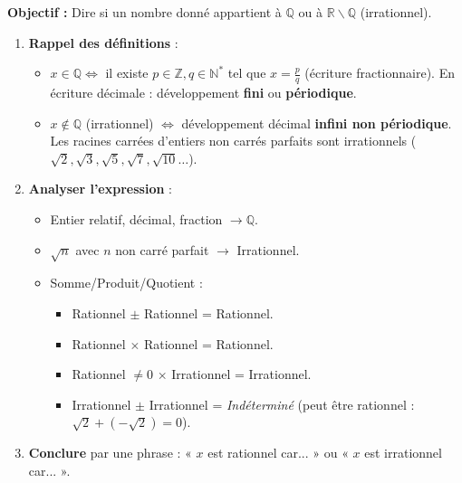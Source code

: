 \documentclass[11pt]{article}
\def\setminus{\mathbin{\backslash}}\let\smallsetminus\setminus
\begin{document}
\begin{methode}
\textbf{Objectif :} Dire si un nombre donné appartient à $\mathbb{Q}$ ou à $\mathbb{R}\setminus\mathbb{Q}$ (irrationnel).
\begin{enumerate}
    \item \textbf{Rappel des définitions} :
    \begin{itemize}
        \item $x \in \mathbb{Q} \iff$ il existe $p \in \mathbb{Z}, q \in \mathbb{N}^*$ tel que $x = \frac{p}{q}$ (écriture fractionnaire). En écriture décimale : développement \textbf{fini} ou \textbf{périodique}.
        \item $x \notin \mathbb{Q}$ (irrationnel) $\iff$ développement décimal \textbf{infini non périodique}. Les racines carrées d'entiers non carrés parfaits sont irrationnels ($\sqrt{2}, \sqrt{3}, \sqrt{5}, \sqrt{7}, \sqrt{10}\dots$).
    \end{itemize}
    \item \textbf{Analyser l'expression} :
    \begin{itemize}
        \item Entier relatif, décimal, fraction $\to \mathbb{Q}$.
        \item $\sqrt{n}$ avec $n$ non carré parfait $\to$ Irrationnel.
        \item Somme/Produit/Quotient : 
        \begin{itemize}
            \item Rationnel $\pm$ Rationnel = Rationnel.
            \item Rationnel $\times$ Rationnel = Rationnel.
            \item Rationnel $\neq 0$ $\times$ Irrationnel = Irrationnel.
            \item Irrationnel $\pm$ Irrationnel = \emph{Indéterminé} (peut être rationnel : $\sqrt{2} + (-\sqrt{2}) = 0$).
        \end{itemize}
    \end{itemize}
    \item \textbf{Conclure} par une phrase : « $x$ est rationnel car... » ou « $x$ est irrationnel car... ».
\end{enumerate}
\end{methode}
\end{document}
